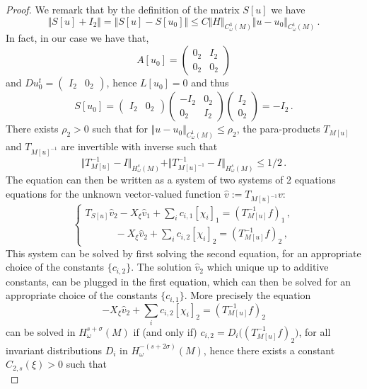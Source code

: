 \documentclass[10pt,a4paper]{amsart}
\begin{document}
\begin{proof}
We remark that by the definition of the matrix $S[u]$ we have
$$
\Vert S[u]  +I_2\Vert = \Vert S[u] - S[u_0] \Vert \leq C \Vert H \Vert_{C^3_\omega(M)} \Vert u-u_0 \Vert_{C^1_\omega(M)} \,.
$$
In fact, in our case we have that, 
$$
A[u_0] = \begin{pmatrix}   0_2   &   I_2 \\  0_2 & 0_2  \end{pmatrix} 
$$
and $Du_0^t =\begin{pmatrix} I_2& 0_2 \end{pmatrix}$, hence $L[u_0] =0$ and thus
$$
S[u_0] = \begin{pmatrix}  I_2 & 0_2 \end{pmatrix} \begin{pmatrix}   -I_2   &   0_2 \\  0_2 & I_2  \end{pmatrix}    \begin{pmatrix}  I_2 \\ 0_2 \end{pmatrix} = -I_2\,. 
$$
There exists $\rho_2>0$ such that for $\Vert u-u_0 \Vert_{C^1_\omega(M)} \leq \rho_2$, the para-products  $T_{M[u]}$ and $T_{M[u]^{-1}}$ are invertible with inverse 
such that 
$$  \Vert T^{-1}_{M[u]} -I \Vert_{H^s_\omega(M)} +  \Vert T^{-1}_{M[u]^{-1}} -I \Vert_{H^s_\omega(M)}   \leq 1/2\,.
$$
The equation can then be written as a system of two systems of 2 equations equations for the unknown vector-valued function 
$\hat v := T_{M[u]^{-1}}  v$:
$$
\begin{cases}  
T_{S[u]}  \hat v_2 -  X_\xi \hat v_1  + \sum_i  c_{i,1} [\chi_{i}]_1  =  (T^{-1}_{M[u]}  f )_1 \,, \\ \quad\quad \quad
-  X_\xi \hat v_2  + \sum_i  c_{i,2} [\chi_{i}]_2  =  (T^{-1}_{M[u]}  f )_2\,,
 \end{cases}
$$
This system can be solved by first solving the second equation, for an appropriate choice of the constants $\{c_{i,2}\}$. The solution
$\hat v_2$ which unique up to additive constants, can be plugged in the first equation, which can then be solved for an appropriate choice 
of the constants $\{c_{i,1}\}$.  More precisely the equation
$$
-  X_\xi \hat v_2  + \sum_i  c_{i,2} [\chi_{i}]_2  =  (T^{-1}_{M[u]}  f )_2
$$
can be solved in $H^{s+\sigma}_\omega(M)$  if (and only if) $c_{i,2} = D_i \Big( (T^{-1}_{M[u]}  f )_2\Big)$, for all invariant distributions 
$D_i$ in $H^{-(s+ 2\sigma)}_\omega(M)$, hence there exists a constant $C_{2,s}(\xi) >0$ such that 
$$
$$
\end{proof}
\end{document}
